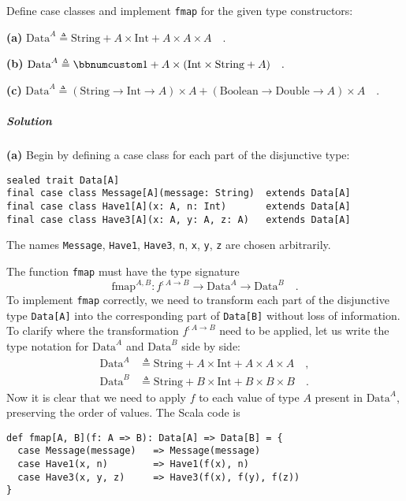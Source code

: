 Define case classes and implement \lstinline!fmap! for the given
type constructors:

\textbf{(a)} $\text{Data}^{A}\triangleq\text{String}+A\times\text{Int}+A\times A\times A\quad.$

\textbf{(b)} $\text{Data}^{A}\triangleq\bbnum 1+A\times(\text{Int}\times\text{String}+A)\quad.$

\textbf{(c)} $\text{Data}^{A}\triangleq(\text{String}\rightarrow\text{Int}\rightarrow A)\times A+(\text{Boolean}\rightarrow\text{Double}\rightarrow A)\times A\quad.$

\subparagraph{Solution}

\textbf{(a)} Begin by defining a case class for each part of the disjunctive
type:
\begin{lstlisting}
sealed trait Data[A] 
final case class Message[A](message: String)  extends Data[A]
final case class Have1[A](x: A, n: Int)       extends Data[A]  
final case class Have3[A](x: A, y: A, z: A)   extends Data[A]
\end{lstlisting}
The names \lstinline!Message!, \lstinline!Have1!, \lstinline!Have3!,
\lstinline!n!, \lstinline!x!, \lstinline!y!, \lstinline!z! are
chosen arbitrarily. 

The function \lstinline!fmap! must have the type signature
\[
\text{fmap}^{A,B}:f^{:A\rightarrow B}\rightarrow\text{Data}^{A}\rightarrow\text{Data}^{B}\quad.
\]
To implement \lstinline!fmap! correctly, we need to transform each
part of the disjunctive type \lstinline!Data[A]! into the corresponding
part of \lstinline!Data[B]! without loss of information. To clarify
where the transformation $f^{:A\rightarrow B}$ need to be applied,
let us write the type notation for $\text{Data}^{A}$ and $\text{Data}^{B}$
side by side:
\begin{align*}
\text{Data}^{A} & \triangleq\text{String}+A\times\text{Int}+A\times A\times A\quad,\\
\text{Data}^{B} & \triangleq\text{String}+B\times\text{Int}+B\times B\times B\quad.
\end{align*}
Now it is clear that we need to apply $f$ to each value of type $A$
present in $\text{Data}^{A}$, preserving the order of values. The
Scala code is
\begin{lstlisting}
def fmap[A, B](f: A => B): Data[A] => Data[B] = {
  case Message(message)   => Message(message)
  case Have1(x, n)        => Have1(f(x), n)
  case Have3(x, y, z)     => Have3(f(x), f(y), f(z))
}
\end{lstlisting}

